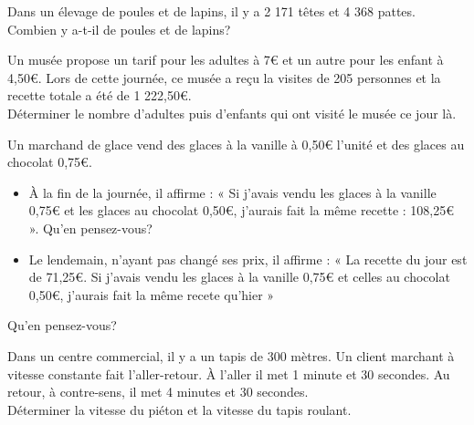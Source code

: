 {\begin{Exercice}
\end{Exercice}

\begin{Exercice}
Dans un élevage de poules et de lapins, il y a 2 171 têtes et 4 368 pattes.\\
Combien y a-t-il de poules et de lapins?
\end{Exercice}



\begin{Exercice}
Un musée propose un tarif pour les adultes à 7€ et un autre pour les enfant à 4,50€. Lors de cette journée, ce musée a reçu la visites de 205 personnes et la recette totale a été de 1 222,50€.\\
Déterminer le nombre d'adultes puis d'enfants qui ont visité le musée ce jour là. 
\end{Exercice}


\begin{Exercice}
Un marchand de glace vend des glaces à la vanille à 0,50€ l'unité et des glaces au chocolat 0,75€.
\begin{itemize}[label=\textcolor{Couleur6}{$\bullet$}]
\item  À la fin de la journée, il affirme : « Si j'avais vendu les glaces à la vanille 0,75€ et les glaces au chocolat 0,50€, j'aurais fait la même recette : 108,25€ ».
Qu'en pensez-vous?
\item  Le lendemain, n'ayant pas changé ses prix, il affirme : « La recette du jour est de 71,25€. Si j'avais vendu les glaces à la vanille 0,75€ et celles au chocolat 0,50€, j'aurais fait la même recete qu'hier »
\end{itemize}
Qu'en pensez-vous?
\end{Exercice}

\begin{Exercice}
Dans un centre commercial, il y a un tapis de 300 mètres.
Un client marchant à vitesse constante fait l'aller-retour. À l'aller il met 1 minute et 30 secondes. Au retour, à contre-sens, il met 4 minutes et 30 secondes.\\
Déterminer la vitesse du piéton et la vitesse du tapis roulant.
\end{Exercice}
}
